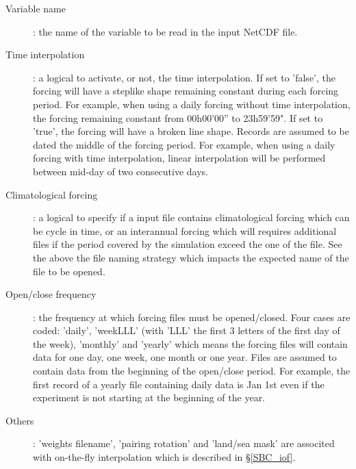 \begin{description}
\item[Variable name]: the name of the variable to be read in the input NetCDF file.

\item[Time interpolation]: a logical to activate, or not, the time interpolation. If set to 'false', 
the forcing will have a steplike shape remaining constant during each forcing period. 
For example, when using a daily forcing without time interpolation, the forcing remaining 
constant from 00h00'00'' to 23h59'59". If set to 'true', the forcing will have a broken line shape. 
Records are assumed to be dated the middle of the forcing period. 
For example, when using a daily forcing with time interpolation, linear interpolation will 
be performed between mid-day of two consecutive days. 

\item[Climatological forcing]: a logical to specify if a input file contains climatological forcing 
which can be cycle in time, or an interannual forcing which will requires additional files 
if the period covered by the simulation exceed the one of the file. See the above the file 
naming strategy which impacts the expected name of the file to be opened. 

\item[Open/close frequency]: the frequency at which forcing files must be opened/closed. 
Four cases are coded: 'daily', 'weekLLL' (with 'LLL' the first 3 letters of the first day of the week), 
'monthly' and 'yearly' which means the forcing files will contain data for one day, one week, 
one month or one year. Files are assumed to contain data from the beginning of the open/close period. 
For example, the first record of a yearly file containing daily data is Jan 1st even if the experiment 
is not starting at the beginning of the year. 

\item[Others]: 'weights filename', 'pairing rotation' and 'land/sea mask' are associted with on-the-fly interpolation 
which is described in \S\ref{SBC_iof}.

\end{description}

